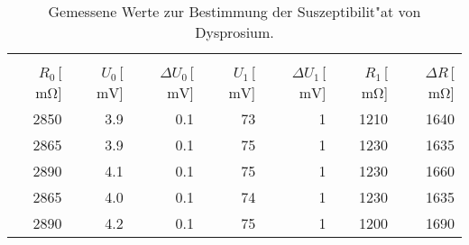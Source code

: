 \begin{table}[!h]
\begin{center}
\begin{tabular}{|r|r|r|r|r|r|r|}
\hline
&&&&&&\\
$R_\mathrm{0}$\,[$\SI{}{\milli\ohm}$] & $U_\mathrm{0}$\,[$\SI{}{\milli\volt}$] & $\Delta U_\mathrm{0}$\,[$\SI{}{\milli\volt}$] & $U_\mathrm{1}$\,[$\SI{}{\milli\volt}$] & $\Delta U_\mathrm{1}$\,[$\SI{}{\milli\volt}$] & $R_\mathrm{1}$\,[$\SI{}{\milli\ohm}$] & $\Delta R$\,[$\SI{}{\milli\ohm}$]\\
\hline
\hline

2850 & 3.9 & 0.1 & 73 & 1 & 1210 & 1640\\
2865 & 3.9 & 0.1 & 75 & 1 & 1230 & 1635\\
2890 & 4.1 & 0.1 & 75 & 1 & 1230 & 1660\\
2865 & 4.0 & 0.1 & 74 & 1 & 1230 & 1635\\
2890 & 4.2 & 0.1 & 75 & 1 & 1200 & 1690\\

\hline
\end{tabular}
\caption[Messwerte zu Aufgabenteil b]{Gemessene Werte zur Bestimmung der Suszeptibilit"at von Dysprosium.}
\label{tabelle:aufgabe_b_Dy}
\end{center}
\end{table}